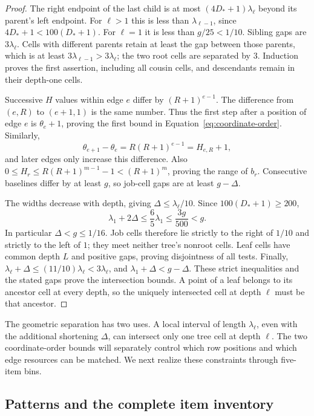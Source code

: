 \begin{proof}
The right endpoint of the last child is at most
$(4D_*+1)\lambda_\ell$ beyond its parent's left endpoint. For
$\ell>1$ this is less than $\lambda_{\ell-1}$, since
$4D_*+1<100(D_*+1)$. For $\ell=1$ it is less than $g/25<1/10$.
Sibling gaps are $3\lambda_\ell$. Cells with different parents retain
at least the gap between those parents, which is at least
$3\lambda_{\ell-1}>3\lambda_\ell$; the two root cells are separated
by $3$. Induction proves the first assertion, including all cousin
cells, and descendants remain in their depth-one cells.

Successive $H$ values within edge $e$ differ by $(R+1)^{e-1}$. The
difference from $(e,R)$ to $(e+1,1)$ is the same number. Thus the first
step after a position of edge $e$ is $\theta_e+1$, proving the first
bound in Equation~\eqref{eq:coordinate-order}. Similarly,
\[
 \theta_{e+1}-\theta_e=R(R+1)^{e-1}=H_{e,R}+1,
\]
and later edges only increase this difference. Also
$0\le H_r\le R(R+1)^{m-1}-1<(R+1)^m$, proving the range of $b_r$.
Consecutive baselines differ by at least $g$, so job-cell gaps are at
least $g-\Delta$.

The widths decrease with depth, giving
$\Delta\le\lambda_\ell/10$. Since $100(D_*+1)\ge200$,
\[
 \lambda_1+2\Delta\le\frac65\lambda_1
 \le\frac{3g}{500}<g.
\]
In particular $\Delta<g\le1/16$. Job cells therefore lie strictly to
the right of $1/10$ and strictly to the left of $1$; they meet neither
tree's nonroot cells. Leaf cells have common depth $L$ and positive
gaps, proving disjointness of all tests. Finally,
$\lambda_\ell+\Delta\le(11/10)\lambda_\ell<3\lambda_\ell$, and
$\lambda_1+\Delta<g-\Delta$. These strict inequalities and the stated
gaps prove the intersection bounds. A point of a leaf belongs to its
ancestor cell at every depth, so the uniquely intersected cell at depth
$\ell$ must be that ancestor.
\end{proof}

The geometric separation has two uses. A local interval of length
$\lambda_\ell$, even with the additional shortening $\Delta$, can
intersect only one tree cell at depth $\ell$. The two coordinate-order
bounds will separately control which row positions and which edge
resources can be matched. We next realize these constraints through
five-item bins.

\subsection{Patterns and the complete item inventory}

